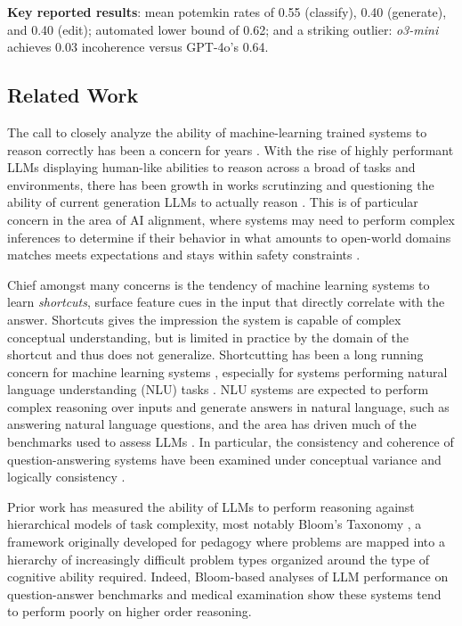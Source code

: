 \documentclass[sigconf,authordraft]{acmart}
\begin{document}
\textbf{Key reported results}: mean potemkin rates of 0.55 (classify), 0.40 (generate), and 0.40 (edit); automated lower bound of 0.62; and a striking outlier: \textit{o3-mini} achieves 0.03 incoherence versus GPT-4o's 0.64.

\subsection{Related Work}

The call to closely analyze the ability of machine-learning trained systems to reason correctly has been a concern for years \citep{Church_Hestness_2019}.  With the rise of highly performant LLMs displaying human-like abilities to reason across a broad of tasks and environments, there has been growth in works scrutinzing and questioning the ability of current generation LLMs to actually reason  \citep{arkoudas2023gpt}. This is of particular concern in the area of AI alignment, where systems may need to perform complex inferences to determine if their behavior in what amounts to open-world domains matches meets expectations and stays within safety constraints \citep{challenges_alignment_safety_llm_anwar2024}.

Chief amongst many concerns is the tendency of machine learning systems to learn \emph{shortcuts}, surface feature cues in the input that directly correlate with the answer.  Shortcuts gives the impression the system is capable of complex conceptual understanding, but is limited in practice by the domain of the shortcut and thus does not generalize.  Shortcutting has been a long running concern for machine learning systems \citep{Church_Hestness_2019}, especially for systems performing natural language understanding (NLU) tasks \citep{du2023shortcut}.  NLU systems are expected to perform complex reasoning over inputs and generate answers in natural language, such as answering natural language questions, and the area has driven much of the benchmarks used to assess LLMs \citep{rajpurkar2016squad, wang2018_GLUE, hendrycks2020measuring}.  In particular, the consistency and coherence of question-answering systems have been examined under conceptual variance \citep{ribeiro-etal-2018-semantically} and logically consistency \citep{ribeiro-etal-2018-semantically}.

Prior work has measured the ability of LLMs to perform reasoning against hierarchical models of task complexity, most notably Bloom's Taxonomy \citep{Krathwohl01112002}, a framework originally developed for pedagogy where problems are mapped into a hierarchy of increasingly difficult problem types organized around the type of cognitive ability required.  Indeed, Bloom-based analyses of LLM performance on question-answer benchmarks \citep{huber-niklaus-2025-llms} and medical examination \citep{herrmann2024assessing} show these systems tend to perform poorly on higher order reasoning.
\end{document}
